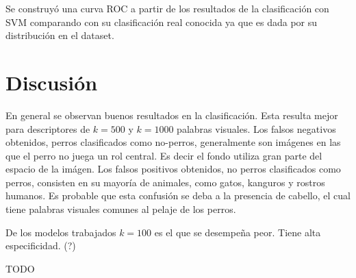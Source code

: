 \documentclass[12pt]{article}
\begin{document}
Se construyó una curva ROC a partir de los resultados de la clasificación con SVM comparando con su clasificación real conocida ya que es dada por su distribución en el dataset.

\section{Discusión}

En general se observan buenos resultados en la clasificación. Esta resulta mejor para descriptores de $k=500$ y $k=1000$ palabras visuales.
Los falsos negativos obtenidos, perros clasificados como no-perros, generalmente son imágenes en las que el perro no juega un rol central.
Es decir el fondo utiliza gran parte del espacio de la imágen. 
Los falsos positivos obtenidos, no perros clasificados como perros, consisten en su mayoría de animales, como gatos, kanguros y rostros humanos.
Es probable que esta confusión se deba a la presencia de cabello, el cual tiene palabras visuales comunes al pelaje de los perros.

De los modelos trabajados $k=100$ es el que se desempeña peor. Tiene alta especificidad. (?)

TODO
\end{document}
